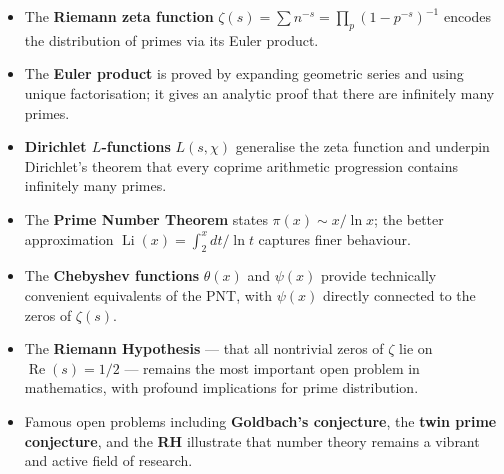 \documentclass[12pt,a4paper,openany]{book}
\theoremstyle{definition}
\theoremstyle{plain}
\theoremstyle{remark}
\begin{document}
\begin{itemize}
  \item The \textbf{Riemann zeta function}
    $\zeta(s) = \sum n^{-s} = \prod_p (1-p^{-s})^{-1}$
    encodes the distribution of primes via its Euler product.
  \item The \textbf{Euler product} is proved by expanding geometric series and
    using unique factorisation; it gives an analytic proof that there are
    infinitely many primes.
  \item \textbf{Dirichlet $L$-functions} $L(s,\chi)$ generalise the zeta
    function and underpin Dirichlet's theorem that every coprime arithmetic
    progression contains infinitely many primes.
  \item The \textbf{Prime Number Theorem} states $\pi(x) \sim x/\ln x$; the
    better approximation $\operatorname{Li}(x) = \int_2^x dt/\ln t$ captures
    finer behaviour.
  \item The \textbf{Chebyshev functions} $\theta(x)$ and $\psi(x)$ provide
    technically convenient equivalents of the PNT, with $\psi(x)$ directly
    connected to the zeros of $\zeta(s)$.
  \item The \textbf{Riemann Hypothesis} --- that all nontrivial zeros of $\zeta$
    lie on $\operatorname{Re}(s) = 1/2$ --- remains the most important open
    problem in mathematics, with profound implications for prime distribution.
  \item Famous open problems including \textbf{Goldbach's conjecture},
    the \textbf{twin prime conjecture}, and the \textbf{RH} illustrate that
    number theory remains a vibrant and active field of research.
\end{itemize}



\backmatter
\end{document}
